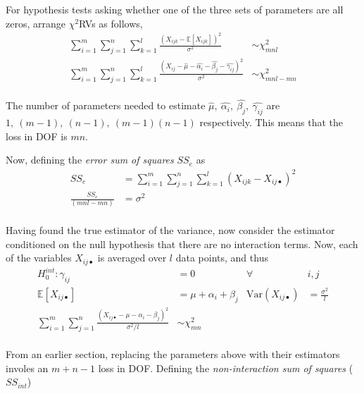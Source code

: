 For hypothesis tests asking whether one of the three sets of parameters are all zeros, arrange $ \chi^2 $RVs as follows,\\

\begin{align}
	\sum\limits_{i = 1}^{m} \sum\limits_{j = 1}^{n} \sum\limits_{k = 1}^{l}\frac{(X_{ijk} - \mathbb{E}[X_{ijk}])^2}{\sigma^2} &\sim \chi^2_{mnl} \nonumber \\
	\sum\limits_{i = 1}^{m} \sum\limits_{j = 1}^{n} \sum\limits_{k = 1}^{l} \frac{(X_{ij} - \widehat{\mu} - \widehat{\alpha_i} - \widehat{\beta_j} - \widehat{\gamma_{ij}})^2}{\sigma^2} &\sim \chi^2_{mnl - mn}
\end{align}\\

The number of parameters needed to estimate $ \widehat{\mu},\ \widehat{\alpha_i},\ \widehat{\beta_j},\  \widehat{\gamma_{ij}} $ are $ 1,\ (m-1),\ (n-1),\ (m-1)(n-1) $ respectively. This means that the loss in DOF is $ mn $.

Now, defining the \textit{error sum of squares} $ SS_e $ as\\

\begin{align}
	SS_e &= \sum\limits_{i = 1}^{m} \sum\limits_{j = 1}^{n} \sum\limits_{k = 1}^{l} (X_{ijk} - X_{ij\bullet})^2 \\
	\frac{SS_e}{(mnl  - mn)} &= \sigma^2
\end{align}\\

Having found the true estimator of the variance, now consider the estimator conditioned on the null hypothesis that there are no interaction terms. Now, each of the variables $ X_{ij\bullet} $ is averaged over $ l $ data points, and thus\\

\begin{align}
	H_0^{\textit{int}} : \gamma_{ij} &= 0 & \forall\ &i,j \nonumber \\
	\mathbb{E}[X_{ij\bullet}] &= \mu + \alpha_i + \beta_j & \mathrm{Var}(X_{ij\bullet}) &= \frac{\sigma^2}{l} \\
	\sum\limits_{i = 1}^{m} \sum\limits_{j = 1}^{n} \frac{(X_{ij\bullet} - \mu - \alpha_i - \beta_j)^2}{\sigma^2 / l} &\sim \chi^2_{mn}
\end{align} \\

From an earlier section, replacing the parameters above with their estimators involes an $ m+n-1 $ loss in DOF. Defining the \textit{non-interaction sum of squares} ($ SS_{int} $) \\

